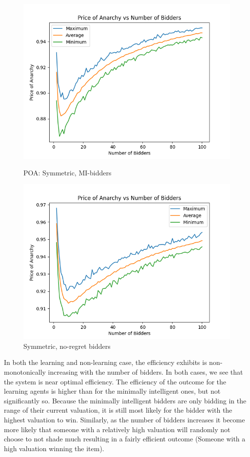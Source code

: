 \documentclass[12pt,twoside]{reedthesis}
\begin{document}
\begin{figure}
	\centering
	\begin{minipage}{0.49\textwidth}
		\centering
		\includegraphics[scale=0.5]{Figures/zi_symmetric}
		\caption{POA: Symmetric, MI-bidders}
		\label{figure:mi_symmetric}
	\end{minipage}
	\begin{minipage}{0.49\textwidth}
		\centering
		\includegraphics[scale=0.5]{Figures/symmetric}
		\caption{Symmetric, no-regret bidders}
		\label{figure:symmetric}
	\end{minipage}
\end{figure}
In both the learning and non-learning case, the efficiency exhibits is non-monotonically increasing with the number of bidders. In both cases, we see that the system is near optimal efficiency. The efficiency of the outcome for the learning agents is higher than for the minimally intelligent ones, but not significantly so. Because the minimally intelligent bidders are only bidding in the range of their current valuation, it is still most likely for the bidder with the highest valuation to win. Similarly, as the number of bidders increases it become more likely that someone with a relatively high valuation will randomly not choose to not shade much resulting in a fairly efficient outcome (Someone with a high valuation winning the item). 
\end{document}
